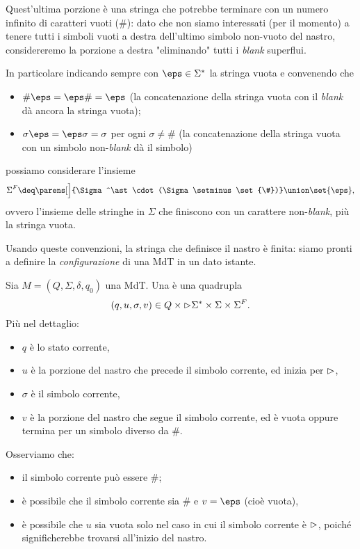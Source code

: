 Quest'ultima porzione è una stringa che potrebbe terminare con un numero infinito di caratteri vuoti ($\#$): dato che non siamo interessati (per il momento) a tenere tutti i simboli vuoti a destra dell'ultimo simbolo non-vuoto del nastro, considereremo la porzione a destra "eliminando" tutti i \emph{blank} superflui.

In particolare indicando sempre con $\eps \in \Sigma^\ast$ la stringa vuota e convenendo che \begin{itemize}
    \item $\#\eps = \eps\# = \eps$ (la concatenazione della stringa vuota con il \emph{blank} dà ancora la stringa vuota);
    \item $\sigma\eps = \eps\sigma = \sigma$ per ogni $\sigma \neq \#$ (la concatenazione della stringa vuota con un simbolo non-\emph{blank} dà il simbolo) 
\end{itemize}
possiamo considerare l'insieme \[
    \Sigma^{F} \deq \parens[\Big]{\Sigma^\ast \cdot (\Sigma \setminus \set{\#})} \union \set{\eps},
\] ovvero l'insieme delle stringhe in $\Sigma$ che finiscono con un carattere non-\emph{blank}, più la stringa vuota.

Usando queste convenzioni, la stringa che definisce il nastro è finita: siamo pronti a definire la \emph{configurazione} di una MdT in un dato istante.

\begin{definition}
    Sia $M = (Q, \Sigma, \delta, q_0)$ una MdT. Una  è una quadrupla \[
        (q, u, \sigma, v) \in Q \times {\vartriangleright}\Sigma^\ast \times \Sigma \times \Sigma^F.
    \] Più nel dettaglio:
    \begin{itemize}
        \item $q$ è lo stato corrente,
        \item $u$ è la porzione del nastro che precede il simbolo corrente, ed inizia per ${\vartriangleright}$,
        \item $\sigma$ è il simbolo corrente,
        \item $v$ è la porzione del nastro che segue il simbolo corrente, ed è vuota oppure termina per un simbolo diverso da $\#$. 
    \end{itemize}
\end{definition}

Osserviamo che:
\begin{itemize}
    \item il simbolo corrente può essere $\#$;
    \item è possibile che il simbolo corrente sia $\#$ e $v = \eps$ (cioè vuota),
    \item è possibile che $u$ sia vuota solo nel caso in cui il simbolo corrente è ${\vartriangleright}$, poiché significherebbe trovarsi all'inizio del nastro.    
\end{itemize}

